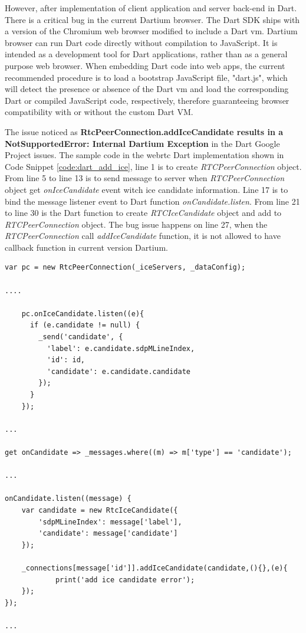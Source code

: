 \par However, after implementation of client application and server back-end in Dart. There is a critical bug in the current Dartium browser. The Dart SDK ships with a version of the Chromium web browser modified to include a Dart \gls{vm}. Dartium browser can run Dart code directly without compilation to JavaScript. It is intended as a development tool for Dart applications, rather than as a general purpose web browser. When embedding Dart code into web apps, the current recommended procedure is to load a bootstrap JavaScript file, "dart.js", which will detect the presence or absence of the Dart \gls{vm} and load the corresponding Dart or compiled JavaScript code, respectively, therefore guaranteeing browser compatibility with or without the custom Dart VM.\cite{wiki:dart} 
\par The issue noticed as \textbf{RtcPeerConnection.addIceCandidate results in a NotSupportedError: Internal Dartium Exception} in the Dart Google Project issues.\cite{bug:dartium} The sample code in the \gls{webrtc} Dart implementation shown in Code Snippet \ref{code:dart_add_ice}, line 1 is to create \textit{RTCPeerConnection} object. From line 5 to line 13 is to send message to server when \textit{RTCPeerConnection} object get \textit{onIceCandidate} event witch \gls{ice} candidate information. Line 17 is to bind the message listener event to Dart function \textit{onCandidate.listen}. From line 21 to line 30 is the Dart function to create \textit{RTCIceCandidate} object and add to \textit{RTCPeerConnection} object. The bug issue happens on line 27, when the \textit{RTCPeerConnection} call \textit{addIceCandidate} function, it is not allowed to have callback function in current version Dartium.

\begin{lstlisting}[caption={Add IceCandidate in Dart},label={code:dart_add_ice}]
var pc = new RtcPeerConnection(_iceServers, _dataConfig);

....

    pc.onIceCandidate.listen((e){
      if (e.candidate != null) {
        _send('candidate', {
          'label': e.candidate.sdpMLineIndex,
          'id': id,
          'candidate': e.candidate.candidate
        });
      }
    });
    
...

get onCandidate => _messages.where((m) => m['type'] == 'candidate');

...

onCandidate.listen((message) {
	var candidate = new RtcIceCandidate({
		'sdpMLineIndex': message['label'],
        'candidate': message['candidate']
    });

    _connections[message['id']].addIceCandidate(candidate,(){},(e){
    		print('add ice candidate error');
    });
});

...
\end{lstlisting}

